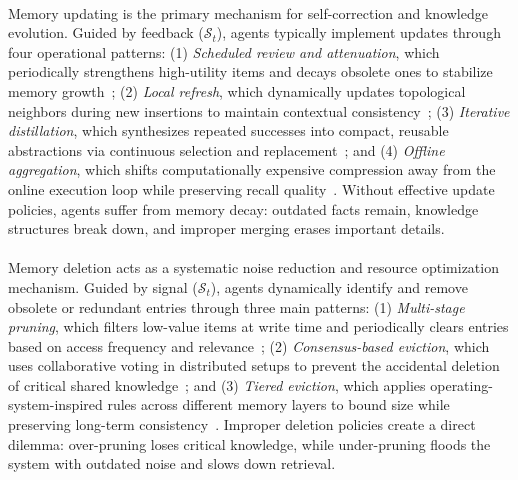 \documentclass{article}
\newcommand{\tagbox}[2][teal!70!black]{
  \tcbox[
    on line,
    enhanced,
    arc=2.5pt,         
    boxrule=0pt,      
    colback=#1,         
    colframe=#1,        
    coltext=white,     
    boxsep=0.2ex,      
    left=0.5ex,right=0.5ex, top=0.1ex,bottom=0.1ex,
    tcbox raise base   
  ]{\sffamily\bfseries #2}
}
\begin{document}
\paragraph{\tagbox[roseviolet]{U}} Memory updating is the primary mechanism for self-correction and knowledge evolution. Guided by feedback ($\mathcal{S}_t$), agents typically implement updates through four operational patterns: (1) \emph{Scheduled review and attenuation}, which periodically strengthens high-utility items and decays obsolete ones to stabilize memory growth~\citep{liang2025selfevolvingagentsreflectivememoryaugmented}; (2) \emph{Local refresh}, which dynamically updates topological neighbors during new insertions to maintain contextual consistency~\citep{xu2025amemagenticmemoryllm}; (3) \emph{Iterative distillation}, which synthesizes repeated successes into compact, reusable abstractions via continuous selection and replacement~\citep{suzgun2025dynamiccheatsheettesttimelearning, zhang2025agenticcontextengineeringevolving}; and (4) \emph{Offline aggregation}, which shifts computationally expensive compression away from the online execution loop while preserving recall quality~\citep{fang2025lightmemlightweightefficientmemoryaugmented}. Without effective update policies, agents suffer from memory decay: outdated facts remain, knowledge structures break down, and improper merging erases important details.
 

\paragraph{\tagbox[VOrange]{D}} Memory deletion acts as a systematic noise reduction and resource optimization mechanism. Guided by signal ($\mathcal{S}_t$), agents dynamically identify and remove obsolete or redundant entries through three main patterns: (1) \emph{Multi-stage pruning}, which filters low-value items at write time and periodically clears entries based on access frequency and relevance~\citep{zhang2025mlcagentcognitivemodelbased}; (2) \emph{Consensus-based eviction}, which uses collaborative voting in distributed setups to prevent the accidental deletion of critical shared knowledge~\citep{bach2025pbftbackedsemanticvotingmultiagent}; and (3) \emph{Tiered eviction}, which applies operating-system-inspired rules across different memory layers to bound size while preserving long-term consistency~\citep{kang2025memory}. Improper deletion policies create a direct dilemma: over-pruning loses critical knowledge, while under-pruning floods the system with outdated noise and slows down retrieval.
\end{document}
